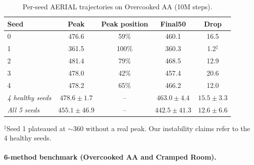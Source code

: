 \documentclass{article}
\theoremstyle{plain}
\theoremstyle{definition}
\theoremstyle{remark}
\begin{document}
\begin{table}[H]
\centering
\caption{Per-seed AERIAL trajectories on Overcooked AA (10M steps).}
\label{tab:aerial_per_seed}
\small
\begin{tabular}{lcccc}
\toprule
\textbf{Seed} & \textbf{Peak} & \textbf{Peak position} & \textbf{Final50} & \textbf{Drop} \\
\midrule
0 & 476.6 & 59\% & 460.1 & 16.5 \\
1 & 361.5 & 100\% & 360.3 & 1.2$^\ddagger$ \\
2 & 481.4 & 79\% & 468.5 & 12.9 \\
3 & 478.0 & 42\% & 457.4 & 20.6 \\
4 & 478.2 & 65\% & 466.2 & 12.0 \\
\midrule
\textit{4 healthy seeds} & \textit{$478.6 \pm 1.7$} & -- & \textit{$463.0 \pm 4.4$} & \textit{$15.5 \pm 3.3$} \\
\textit{All 5 seeds} & \textit{$455.1 \pm 46.9$} & -- & \textit{$442.5 \pm 41.3$} & \textit{$12.6 \pm 6.6$} \\
\bottomrule
\end{tabular}

\vspace{2pt}
{\footnotesize $^\ddagger$Seed 1 plateaued at $\sim$360 without a real peak. Our instability claims refer to the 4 healthy seeds.}
\end{table}

\paragraph{6-method benchmark (Overcooked AA and Cramped Room).}
\end{document}

